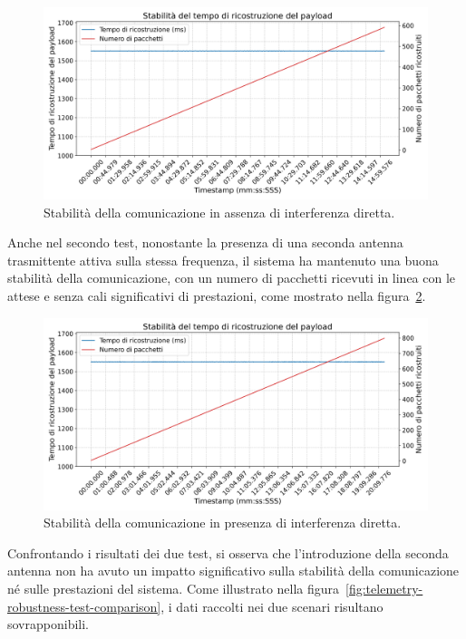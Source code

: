 \documentclass[12pt,a4paper,twoside]{book}
\begin{document}
\begin{figure}[H]
    \centering
    \includegraphics[width=\textwidth]{img/tests/T5/T5.png}
    \caption{Stabilità della comunicazione in assenza di interferenza diretta.}
    \label{fig:telemetry-robustness-test}
\end{figure}
\newpage

Anche nel secondo test, nonostante la presenza di una seconda antenna trasmittente
attiva sulla stessa frequenza, il sistema ha mantenuto una buona stabilità della
comunicazione, con un numero di pacchetti ricevuti in linea con le attese e senza
cali significativi di prestazioni, come mostrato nella figura~\ref{fig:telemetry-robustness-test-2}.

\begin{figure}[H]
    \centering
    \includegraphics[width=\textwidth]{img/tests/T6/T6.png}
    \caption{Stabilità della comunicazione in presenza di interferenza diretta.}
    \label{fig:telemetry-robustness-test-2}
\end{figure}

Confrontando i risultati dei due test, si osserva che l'introduzione della seconda
antenna non ha avuto un impatto significativo sulla stabilità della comunicazione
né sulle prestazioni del sistema. Come illustrato nella figura~\ref{fig:telemetry-robustness-test-comparison},
i dati raccolti nei due scenari risultano sovrapponibili.
\end{document}
